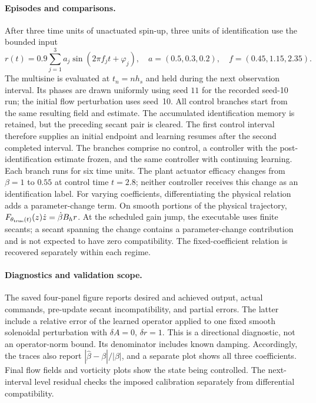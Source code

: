 \documentclass[10pt]{article}
\begin{document}
\paragraph{Episodes and comparisons.}
After three time units of unactuated spin-up, three units of identification
use the bounded input
\begin{equation}
 r(t)=0.9\sum_{j=1}^3a_j\sin(2\pi f_jt+\varphi_j),
 \quad a=(0.5,0.3,0.2),\quad f=(0.45,1.15,2.35).
\end{equation}
The multisine is evaluated at $t_n=nh_s$ and held during the next observation
interval. Its phases are drawn uniformly using seed $11$ for the recorded
seed-10 run; the initial flow perturbation uses seed~10. All control branches
start from the same resulting field and estimate. The accumulated
identification memory is retained, but the preceding secant pair is cleared.
The first control interval therefore supplies an initial endpoint and
learning resumes after the second completed interval. The branches comprise no control,
a controller with the post-identification estimate frozen, and the same
controller with continuing learning. Each branch runs for six time units.
The plant actuator efficacy changes from $\beta=1$ to $0.55$ at control
time $t=2.8$; neither controller receives this change as an identification
label. For varying coefficients, differentiating the physical relation
adds a parameter-change term. On smooth portions of the physical trajectory,
$F_{\theta_{\rm true}(t)}(z)\dot z=\dot\beta B_hr$.
At the scheduled gain jump, the executable uses finite secants; a secant
spanning the change contains a parameter-change contribution and is not
expected to have zero compatibility. The fixed-coefficient relation is
recovered separately within each regime.

\paragraph{Diagnostics and validation scope.}
The saved four-panel figure reports desired and achieved output, actual
commands, pre-update secant incompatibility, and partial errors. The latter
include a relative error of the learned operator applied to one fixed smooth solenoidal perturbation
with $\delta A=0$, $\delta r=1$. This is a directional diagnostic, not an
operator-norm bound. Its denominator includes known damping. Accordingly,
the traces also report $|\widehat\beta-\beta|/|\beta|$, and a separate plot
shows all three coefficients. Final flow fields and vorticity plots show
the state being controlled. The next-interval level residual checks the
imposed calibration separately from differential compatibility.
\end{document}
